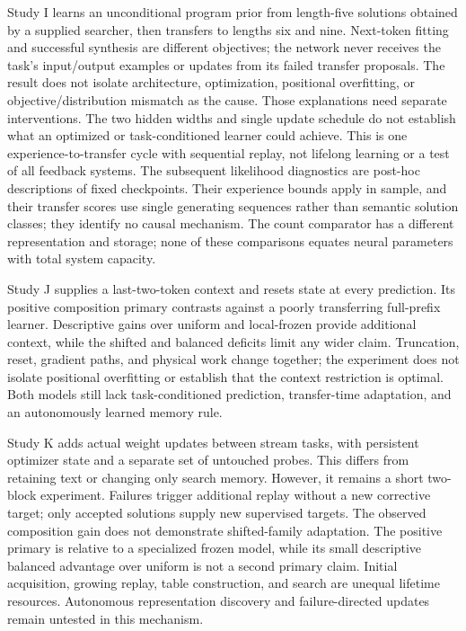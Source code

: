 \documentclass[11pt]{article}
\begin{document}
Study I learns an unconditional program prior from length-five solutions
obtained by a supplied searcher, then transfers to lengths six and nine.
Next-token fitting and successful synthesis are different objectives; the
network never receives the task's input/output examples or updates from its
failed transfer proposals. The result does not isolate architecture,
optimization, positional overfitting, or objective/distribution mismatch as
the cause. Those explanations need separate interventions. The two hidden
widths and single update schedule do not establish what an optimized or
task-conditioned learner could achieve. This is one experience-to-transfer
cycle with sequential replay, not lifelong learning or a test of all feedback
systems. The subsequent likelihood diagnostics are post-hoc descriptions of
fixed checkpoints. Their experience bounds apply in sample, and their transfer
scores use single generating sequences rather than semantic solution classes;
they identify no causal mechanism. The count comparator has a different representation and storage;
none of these comparisons equates neural parameters with total system capacity.

Study J supplies a last-two-token context and resets state at every prediction.
Its positive composition primary contrasts against a poorly transferring
full-prefix learner. Descriptive gains over uniform and local-frozen provide
additional context, while the shifted and balanced deficits limit any wider
claim. Truncation, reset, gradient paths, and physical work change together;
the experiment does not isolate positional overfitting or establish that the
context restriction is optimal. Both models still lack task-conditioned
prediction, transfer-time adaptation, and an autonomously learned memory rule.

Study K adds actual weight updates between stream tasks, with persistent
optimizer state and a separate set of untouched probes. This differs from
retaining text or changing only search memory. However, it remains a short
two-block experiment. Failures trigger additional replay without a new
corrective target; only accepted solutions supply new supervised targets.
The observed composition gain does not demonstrate shifted-family adaptation.
The positive primary is relative to a specialized frozen model, while its
small descriptive balanced advantage over uniform is not a second primary
claim. Initial acquisition, growing replay, table construction, and search
are unequal lifetime resources. Autonomous representation discovery and
failure-directed updates remain untested in this mechanism.
\end{document}
